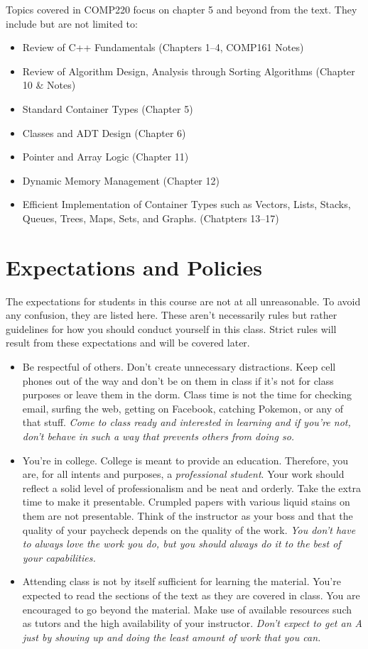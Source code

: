 \documentclass[10pt]{article}
\begin{document}
Topics covered in COMP220 focus on chapter 5 and beyond from the text. They include but are not limited to:
\begin{itemize}
\item Review of C++ Fundamentals (Chapters 1--4, COMP161 Notes)
\item Review of Algorithm Design, Analysis through Sorting Algorithms (Chapter 10 \& Notes)
\item Standard Container Types (Chapter 5)
\item Classes and ADT Design (Chapter 6)
\item Pointer and Array Logic (Chapter 11)
\item Dynamic Memory Management (Chapter 12)
\item Efficient Implementation of Container Types such as Vectors, Lists, Stacks, Queues, Trees, Maps, Sets, and Graphs. (Chatpters 13--17)
\end{itemize}


\section{Expectations and Policies}
The expectations for students in this course are not at all unreasonable.  To avoid any confusion, they are listed here.  These aren't necessarily rules but rather guidelines for how you should conduct yourself in this class.  Strict rules will result from these expectations and will be covered later.
\begin{itemize}
\item Be respectful of others.  Don't create unnecessary distractions.  Keep cell phones out of the way and don't be on them in class if it's not for class purposes or leave them in the dorm.  Class time is not the time for checking email, surfing the web, getting on Facebook, catching Pokemon, or any of that stuff. \textit{Come to class ready and interested in learning and if you're not, don't behave in such a way that prevents others from doing so.}
\item You're in college.  College is meant to provide an education.  Therefore, you are, for all intents and purposes, a \textit{professional student}.  Your work should reflect a solid level of professionalism and be neat and orderly.  Take the extra time to make it presentable.  Crumpled papers with various liquid stains on them are not presentable.  Think of the instructor as your boss and that the quality of your paycheck depends on the quality of the work.  \textit{You don't have to always love the work you do, but you should always do it to the best of your capabilities.}
\item Attending class is not by itself sufficient for learning the material.  You're expected to read the sections of the text as they are covered in class.  You are encouraged to go beyond the material.  Make use of available resources such as tutors and the high availability of your instructor.  \textit{Don't expect to get an A just by showing up and doing the least amount of work that you can.}
\end{itemize}
\end{document}
